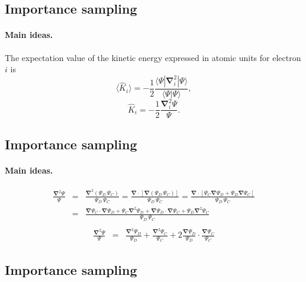 \documentclass[%
twoside,                 %
final,                   %
10pt]{article}
\begin{document}
{{{{{{%
\subsection{Importance sampling}

\paragraph{Main ideas.}
The expectation value of the kinetic energy expressed in atomic units for electron $i$ is 
\[
 \langle \hat{K}_i \rangle = -\frac{1}{2}\frac{\langle\Psi|\mathbf{\nabla}_{i}^2|\Psi \rangle}{\langle\Psi|\Psi \rangle},
\]
\[
\hat{K}_i = -\frac{1}{2}\frac{\mathbf{\nabla}_{i}^{2} \Psi}{\Psi}.
\]




\subsection{Importance sampling}

\paragraph{Main ideas.}
\begin{eqnarray}
\frac{\mathbf{\nabla}^2 \Psi}{\Psi} & = & \frac{\mathbf{\nabla}^2 ({\Psi_{D} \,  \Psi_C})}{\Psi_{D} \,  \Psi_C} = \frac{\mathbf{\nabla}  \cdot [\mathbf{\nabla}  {(\Psi_{D} \,  \Psi_C)}]}{\Psi_{D} \,  \Psi_C} = \frac{\mathbf{\nabla}  \cdot [ \Psi_C \mathbf{\nabla}  \Psi_{D} + \Psi_{D} \mathbf{\nabla}   \Psi_C]}{\Psi_{D} \,  \Psi_C}\nonumber\\
&  = & \frac{\mathbf{\nabla}   \Psi_C \cdot \mathbf{\nabla}  \Psi_{D} +  \Psi_C \mathbf{\nabla}^2 \Psi_{D} + \mathbf{\nabla}  \Psi_{D} \cdot \mathbf{\nabla}   \Psi_C + \Psi_{D} \mathbf{\nabla}^2  \Psi_C}{\Psi_{D} \,  \Psi_C}\nonumber\\
\end{eqnarray}
\begin{eqnarray}
\frac{\mathbf{\nabla}^2 \Psi}{\Psi}
& = & \frac{\mathbf{\nabla}^2 \Psi_{D}}{\Psi_{D}} + \frac{\mathbf{\nabla}^2  \Psi_C}{ \Psi_C} + 2 \frac{\mathbf{\nabla}  \Psi_{D}}{\Psi_{D}}\cdot\frac{\mathbf{\nabla}   \Psi_C}{ \Psi_C}
\end{eqnarray}


\subsection{Importance sampling}

}}}}}}
\end{document}
